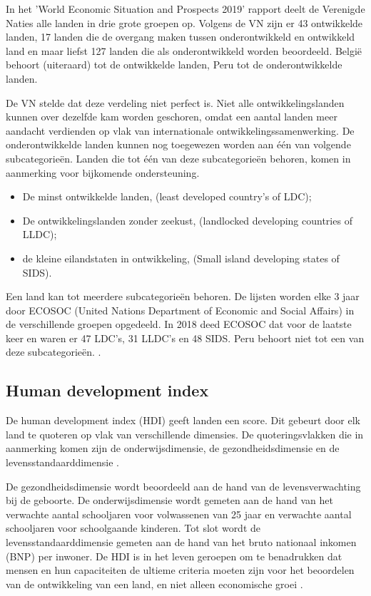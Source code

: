 In het 'World Economic Situation and Prospects 2019' rapport \autocite{unitednations2019} deelt de Verenigde Naties alle landen in drie grote groepen op. Volgens de VN zijn er 43 ontwikkelde landen, 17 landen die de overgang maken tussen onderontwikkeld en ontwikkeld land en maar liefst 127 landen die als onderontwikkeld worden beoordeeld. België behoort (uiteraard) tot de ontwikkelde landen, Peru tot de onderontwikkelde landen.

De VN stelde dat deze verdeling niet perfect is. Niet alle ontwikkelingslanden kunnen over dezelfde kam worden geschoren, omdat een aantal landen meer aandacht verdienden op vlak van internationale ontwikkelingssamenwerking. De onderontwikkelde landen kunnen  nog toegewezen worden aan één van volgende subcategorieën. Landen die tot één van deze subcategorieën behoren, komen in aanmerking voor bijkomende ondersteuning.

\begin{itemize}
\item De minst ontwikkelde landen, (least developed country's of LDC);
\item De ontwikkelingslanden zonder zeekust, (landlocked developing countries of LLDC);
\item de kleine eilandstaten in ontwikkeling, (Small island developing states of SIDS).
\end{itemize}
\autocite{MarcJ.Bossuyt2005}

Een land kan tot meerdere subcategorieën behoren. De lijsten worden elke 3 jaar door ECOSOC (United Nations Department of Economic and Social Affairs) in de verschillende groepen opgedeeld. \autocite{ecosoc2018} In 2018 deed ECOSOC dat voor de laatste keer en waren er 47 LDC's, 31 LLDC's en 48 SIDS. Peru behoort niet tot een van deze subcategorieën. \autocite{MarcJ.Bossuyt2005}.

\subsection{Human development index}
De human development index (HDI) geeft landen een score. Dit gebeurt door elk land te quoteren op vlak van verschillende dimensies. De quoteringsvlakken die in aanmerking komen zijn de onderwijsdimensie, de gezondheidsdimensie en de levensstandaarddimensie \autocite{UNDP2019}.

De gezondheidsdimensie wordt beoordeeld aan de hand van de levensverwachting bij de geboorte. De onderwijsdimensie wordt gemeten aan de hand van het verwachte aantal schooljaren voor volwassenen van 25 jaar en verwachte aantal schooljaren voor schoolgaande kinderen. Tot slot wordt de levensstandaarddimensie gemeten aan de hand van het bruto nationaal inkomen (BNP) per inwoner. De HDI is in het leven geroepen om te benadrukken dat mensen en hun capaciteiten de ultieme criteria moeten zijn voor het beoordelen van de ontwikkeling van een land, en niet alleen economische groei \autocite{UNDP2019}.

